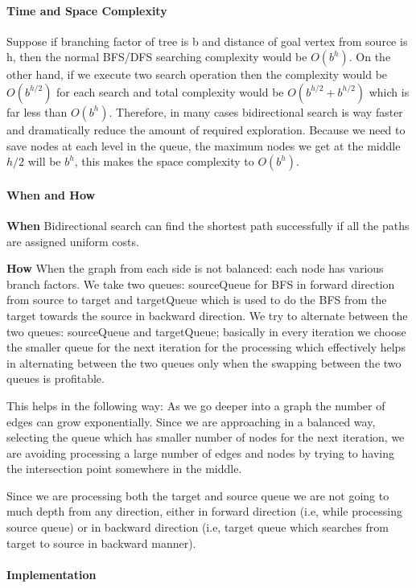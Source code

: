 \paragraph{Time and Space Complexity} 
Suppose if branching factor of tree is b and distance of goal vertex from source is h, then the normal BFS/DFS searching complexity would be $O(b^h)$. On the other hand, if we execute two search operation then the complexity would be $O(b^{h/2})$ for each search and total complexity would be $O(b^{h/2}+b^{h/2})$ which is far less than $O(b^h)$. Therefore,  in many cases bidirectional search is way faster and dramatically reduce the amount of required exploration. Because we need to save nodes at each level in the queue, the maximum nodes we get at the middle $h/2$ will be $b^h$, this makes the space complexity to $O(b^h)$. 

\paragraph{When and How}
\textbf{When} Bidirectional search can find the shortest path successfully if all the paths are assigned uniform costs. 

\textbf{How} When the graph from each side is not balanced: each node has various branch factors.  We take two queues: sourceQueue for BFS in forward direction from source to target and targetQueue which is used to do the BFS from the target towards the source in backward direction. We try to alternate between the two queues: sourceQueue and targetQueue; basically in every iteration we choose the smaller queue for the next iteration for the processing which effectively helps in alternating between the two queues only when the swapping between the two queues is profitable.

This helps in the following way: As we go deeper into a graph the number of edges can grow exponentially. Since we are approaching in a balanced way, selecting the queue which has smaller number of nodes for the next iteration, we are avoiding processing a large number of edges and nodes by trying to having the intersection point somewhere in the middle.

Since we are processing both the target and source queue we are not going to much depth from any direction, either in forward direction (i.e, while processing source queue) or in backward direction (i.e, target queue which searches from target to source in backward manner).

\paragraph{Implementation}